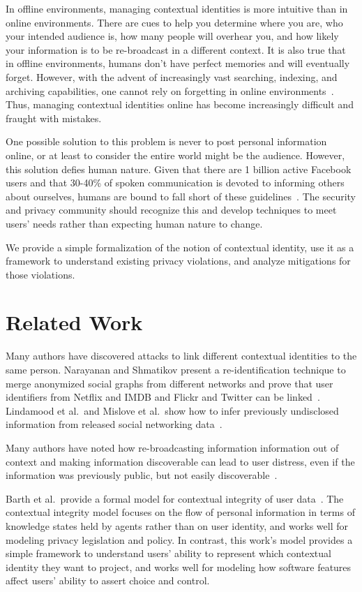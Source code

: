 \documentclass{llncs}
\begin{document}
In offline environments, managing contextual identities is more intuitive than
in online environments. There are cues to help you determine where you are,
who your intended audience is, how many people will overhear you, and how
likely your information is to be re-broadcast in a different context. It is
also true that in offline environments, humans don't have perfect memories and
will eventually forget.  However, with the advent of increasingly vast
searching, indexing, and archiving capabilities, one cannot rely on forgetting
in online environments~\cite{delete}. Thus, managing contextual identities
online has become increasingly difficult and fraught with mistakes.

One possible solution to this problem is never to post personal information
online, or at least to consider the entire world might be the audience.
However, this solution defies human nature. Given that there are 1 billion
active Facebook users and that 30-40\% of spoken communication is devoted to
informing others about ourselves, humans are bound to fall short of these
guidelines~\cite{tamir,fbusers}. The security and privacy community should
recognize this and develop techniques to meet users' needs rather than
expecting human nature to change.

We provide a simple formalization of the notion of contextual identity, use it
as a framework to understand existing privacy violations, and analyze
mitigations for those violations.

\section{Related Work}

Many authors have discovered attacks to link different contextual identities to
the same person. Narayanan and Shmatikov present a re-identification technique
to merge anonymized social graphs from different networks and prove that
user identifiers from Netflix and IMDB and Flickr and Twitter can be
linked~\cite{narayanan1,narayanan2}. Lindamood et al.~and Mislove et al.~show
how to infer previously undisclosed information from released social networking
data~\cite{lindamood,mislove}.

Many authors have noted how re-broadcasting information information out of
context and making information discoverable can lead to user distress, even if
the information was previously public, but not easily
discoverable~\cite{boyd1,chew,nissenbaum}.

Barth et al.~provide a formal model for contextual integrity of user
data~\cite{barth}. The contextual integrity model focuses on the flow of
personal information in terms of knowledge states held by agents rather than on
user identity, and works well for modeling privacy legislation and policy. In
contrast, this work's model provides a simple framework to understand users'
ability to represent which contextual identity they want to project, and works
well for modeling how software features affect users' ability to assert choice
and control.
\end{document}
